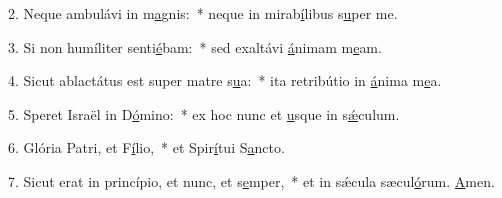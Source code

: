 2. Neque ambulávi in m\uline{a}gnis:~* neque in mirab\uline{í}libus s\uline{u}per me.\par 
3. Si non humíliter senti\uline{é}bam:~* sed exaltávi \uline{á}nimam m\uline{e}am.\par 
4. Sicut ablactátus est super matre s\uline{u}a:~* ita retribútio in \uline{á}nima m\uline{e}a.\par 
5. Speret Israël in D\uline{ó}mino:~* ex hoc nunc et \uline{u}sque in s\uline{ǽ}culum.\par 
6. Glória Patri, et F\uline{í}lio,~* et Spir\uline{í}tui S\uline{a}ncto.\par 
7. Sicut erat in princípio, et nunc, et s\uline{e}mper,~* et in sǽcula sæcul\uline{ó}rum. \uline{A}men.\par 
